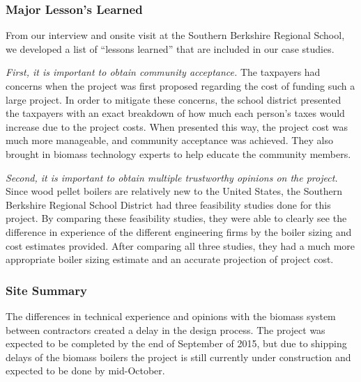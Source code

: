 \subsubsection{Major Lesson’s Learned}
\par From our interview and onsite visit at the Southern Berkshire Regional School, we developed a list of “lessons learned” that are included in our case studies.
\par \emph{First, it is important to obtain community acceptance.} The taxpayers had concerns when the project was first proposed regarding the cost of funding such a large project. In order to mitigate these concerns, the school district presented the taxpayers with an exact breakdown of how much each person’s taxes would increase due to the project costs. When presented this way, the project cost was much more manageable, and community acceptance was achieved. They also brought in biomass technology experts to help educate the community members.

\par \emph{Second, it is important to obtain multiple trustworthy opinions on the project.} Since wood pellet boilers are relatively new to the United States, the Southern Berkshire Regional School District had three feasibility studies done for this project. By comparing these feasibility studies, they were able to clearly see the difference in experience of the different engineering firms by the boiler sizing and cost estimates provided. After comparing all three studies, they had a much more appropriate boiler sizing estimate and an accurate projection of project cost. 

\subsubsection{Site Summary}
\par The differences in technical experience and opinions with the biomass system between contractors created a delay in the design process. The project was expected to be completed by the end of September of 2015, but due to shipping delays of the biomass boilers the project is still currently under construction and expected to be done by mid-October.

